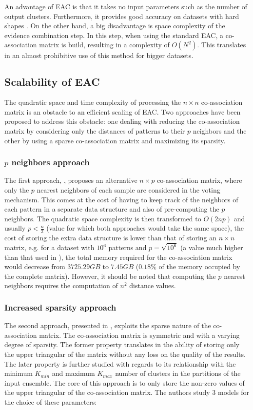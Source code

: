 An advantage of EAC is that it takes no input parameters such as the number of output clusters.
Furthermore, it provides good accuracy on datasets with hard shapes \cite{Fred2005}.
On the other hand, a big disadvantage is space complexity of the evidence combination step.
In this step, when using the standard EAC, a co-association matrix is build, resulting in a complexity of $O(N^2)$.
This translates in an almost prohibitive use of this method for bigger datasets.


\subsection{Scalability of EAC} 
The quadratic space and time complexity of processing the $n \times n$ co-association matrix is an obstacle to an efficient scaling of EAC.
Two approaches have been proposed to address this obstacle: one dealing with reducing the co-association matrix by considering only the distances of patterns to their $p$ neighbors and the other by using a sparse co-association matrix and maximizing its sparsity.

\subsubsection{$p$ neighbors approach}
The first approach, \cite{Fred2005}, proposes an alternative $n \times p$ co-association matrix, where only the $p$ nearest neighbors of each sample are considered in the voting mechanism.
This comes at the cost of having to keep track of the neighbors of each pattern in a separate data structure and also of pre-computing the $p$ neighbors.
The quadratic space complexity is then transformed to $O(2np)$ and usually $p < \frac{n}{2}$ (value for which both approaches would take the same space), the cost of storing the extra data structure is lower than that of storing an $n \times n$ matrix, e.g. for a dataset with $10^6$ patterns and $p=\sqrt{10^6}$ (a value much higher than that used in \cite{Fred2005}), the total memory required for the co-association matrix would decrease from $3725.29 GB$ to $7.45 GB$ ($0.18\%$ of the memory occupied by the complete matrix).
However, it should be noted that computing the $p$ nearest neighbors requires the computation of $n^2$ distance values.

\subsubsection{Increased sparsity approach}
The second approach, presented in \cite{Lourenco2010}, exploits the sparse nature of the co-association matrix.
The co-association matrix is symmetric and with a varying degree of sparsity.
The former property translates in the ability of storing only the upper triangular of the matrix without any loss on the quality of the results.
The later property is further studied with regards to its relationship with the minimum $K_{min}$ and maximum $K_{max}$ number of clusters in the partitions of the input ensemble.
The core of this approach is to only store the non-zero values of the upper triangular of the co-association matrix.
The authors study 3 models for the choice of these parameters:


